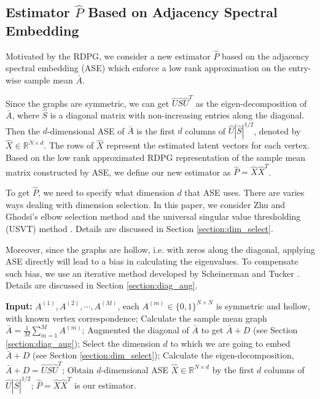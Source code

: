 \documentclass[a4paper]{article}
\begin{document}
\subsection{Estimator $\hat{P}$ Based on Adjacency Spectral Embedding}

Motivated by the RDPG, we consider a new estimator $\hat{P}$ based on the adjacency spectral embedding (ASE) which enforce a low rank approximation on the entry-wise sample mean $\bar{A}$.

Since the graphs are symmetric, we can get $\hat{U} \hat{S} \hat{U}^T$ as the eigen-decomposition of $\bar{A}$, where $\hat{S}$ is a diagonal matrix with non-increasing entries along the diagonal. Then the $d$-dimensional ASE of $\bar{A}$ is the first $d$ columns of $\hat{U} |\hat{S}|^{1/2}$, denoted by $\hat{X} \in \mathbb{R}^{N \times d}$. The rows of $\hat{X}$ represent the estimated latent vectors for each vertex. 
Based on the low rank approximated RDPG representation of the sample mean matrix constructed by ASE, we define our new estimator as $\hat{P} = \hat{X} \hat{X}^T$.

To get $\hat{P}$, we need to specify what dimension $d$ that ASE uses. There are varies ways dealing with dimension selection. In this paper, we consider Zhu and Ghodsi's elbow selection method \cite{zhu2006automatic} and the universal singular value thresholding (USVT) method \cite{chatterjee2015matrix}. Details are discussed in Section \ref{section:dim_select}.

Moreover, since the graphs are hollow, i.e. with zeros along the diagonal, applying ASE directly will lead to a bias in calculating the eigenvalues. To compensate such bias, we use an iterative method developed by Scheinerman and Tucker \cite{scheinerman2010modeling}. Details are discussed in Section \ref{section:diag_aug}.


\begin{algorithm}[H]
\caption{}
\label{algo:basic}
\begin{algorithmic}[1]
\STATE \textbf{Input:} $A^{(1)}, A^{(2)}, \cdots, A^{(M)}$, each $A^{(m)} \in \{0,1\}^{N \times N}$ is symmetric and hollow, with known vertex correspondence;
\STATE Calculate the sample mean graph $\bar{A} = \frac{1}{M}\sum\limits_{m = 1}^M A^{(m)}$;
\STATE Augmented the diagonal of $\bar{A}$ to get $\bar{A} + D$ (see Section \ref{section:diag_aug});
\STATE Select the dimension $d$ to which we are going to embed $\bar{A} + D$ (see Section \ref{section:dim_select});
\STATE Calculate the eigen-decomposition, $\bar{A} + D = \hat{U} \hat{S} \hat{U}^T$;
\STATE Obtain $d$-dimensional ASE $\hat{X} \in \mathbb{R}^{N \times d}$ by the first $d$ columns of $\hat{U} |\hat{S}|^{1/2}$;
\STATE $\hat{P} = \hat{X} \hat{X}^{T}$ is our estimator.
\end{algorithmic}
\end{algorithm}
\end{document}
